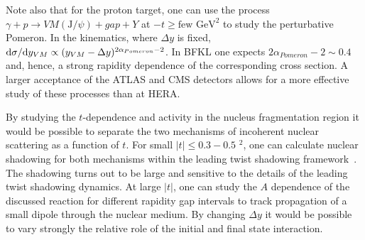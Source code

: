 \documentclass[../report.tex]{subfiles}
\begin{document}
Note also that for the proton target, one can use the process  $\gamma + p \to VM (\mathrm{J}/\psi) + gap + Y$  at   
$-t \ge \mbox{few GeV}^2$ to study the perturbative Pomeron. 
In the kinematics, where $\Delta y$ is fixed, 
$\mathrm{d} \sigma /\mathrm{d} y_{VM} \propto (y_{VM}- \Delta y)^{2\alpha_{Pomeron}-2}$. In BFKL one expects
$2\alpha_{Pomeron}-2\sim 0.4$ and, hence, a strong rapidity dependence of the corresponding cross section. A larger acceptance of the ATLAS and CMS detectors allows for a more effective study of these processes than at HERA.


By studying the $t$-dependence and activity in the nucleus 
fragmentation region it would be possible to separate the two mechanisms of incoherent nuclear scattering as a function of $t$.
For small $|t| \le 0.3 - 0.5$ \UGeV$^2$, one can calculate nuclear shadowing for both mechanisms within the leading 
twist shadowing framework~\cite{Guzey:2013jaa}. The shadowing turns out to be large and sensitive to the details of the leading twist shadowing dynamics.  At large $|t|$, one can study the $A$ dependence of the discussed reaction for different rapidity gap  
intervals to track propagation of a small dipole through the nuclear medium.
 By changing $\Delta y$ it would be possible to vary  strongly the relative role of the initial and final state interaction.



\end{document}
